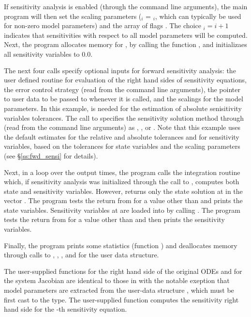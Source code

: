 If sensitivity analysis is enabled (through the command line arguments), 
the main program will then set the scaling parameters
 ($_i$ = $_i$, which can typically be used for 
non-zero model parameters) and the array of flags . The choice $_i=i+1$
indicates that sensitivities with respect to all model parameters will be computed.
Next, the program allocates memory for , by calling the {\nvecs} function 
, and initializaes all sensitivity variables to $0.0$.

The next four calls specify optional inputs for forward sensitivity analysis:
the user defined routine for evaluation of the right hand
sides of sensitivity equations, the error control strategy
(read from the command line arguments), the pointer to
user data to be passed to  whenever it is called, and  
the scalings for the model parameters. In this example,  is needed for the 
estimation of absolute senisitivity variables tolerances.
The call to  specifies the sensitivity solution method through 
 (read from the command line arguments) as , 
, or .
Note that this example uses the default estimates for the relative and absolute tolerances 
 and  for sensitivity variables, based on the tolerances for state 
variables and the scaling parameters  (see \S\ref{ss:fwd_sensi} for details).

Next, in a loop over the  output times, the program calls the integration
routine  which, if sensitivity analysis was initialized through the call
to , computes both state and sensitivity variables. However,
 returns only the state solution at  in the vector .
The program tests the return from  for a value other than  and
prints the state variables.
Sensitivity variables at  are loaded into  by calling .
The program tests the return from  for a value other than  
and then prints the sensitivity variables.

Finally, the program prints some statistics (function ) 
and deallocates memory through calls
to , , 
, and  for the user data structure.

The user-supplied functions  for the right hand side of the original ODEs and
 for the system Jacobian are identical to those in  with the 
notable exeption that model parameters are extracted from the user-data structure
, which must be first cast to the  type. The user-supplied
function  computes the sensitivity right hand side for the -th 
sensitivity equation.

